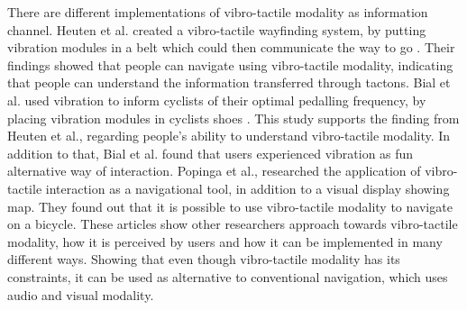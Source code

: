 \documentclass{sigchi}
\begin{document}
\newline
\newline
There are different implementations of vibro-tactile modality as information channel. Heuten et al. created a vibro-tactile wayfinding system, by putting vibration modules in a belt which could then communicate the way to go \cite{heuten08}. Their findings showed that people can navigate using vibro-tactile modality, indicating that people can understand the information transferred through tactons. 
Bial et al. used vibration to inform cyclists of their optimal pedalling frequency, by placing vibration modules in cyclists shoes \cite{bial11}. This study supports the finding from Heuten et al., regarding people's ability to understand vibro-tactile modality. In addition to that, Bial et al. found that users experienced vibration as fun alternative way of interaction. 
\newline
\newline
Popinga et al., researched the application of vibro-tactile interaction as a navigational tool, in addition to a visual display showing map. They found out that it is possible to use vibro-tactile modality to navigate on a bicycle\cite{poppinga09}.
\newline
\newline
These articles show other researchers approach towards vibro-tactile modality, how it is perceived by users and how it can be implemented in many different ways. Showing that even though vibro-tactile modality has its constraints, it can be used as alternative to conventional navigation, which uses audio and visual modality.
\end{document}
